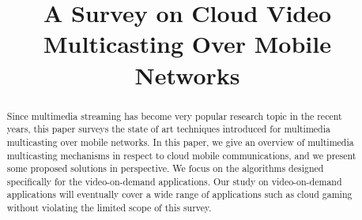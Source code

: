 \documentclass[conference]{IEEEtran}
\begin{document}
\title{A Survey on Cloud Video Multicasting Over Mobile Networks}


\author{

}



\maketitle
\begin{abstract}
Since multimedia streaming has become very popular research topic in the recent years, this paper surveys the state of art techniques introduced for multimedia multicasting over mobile networks. In this paper, we give an overview of multimedia multicasting mechanisms in respect to cloud mobile communications, and we present some proposed solutions in perspective. We focus on the algorithms designed specifically for the video-on-demand applications. Our study on video-on-demand applications will eventually cover a wide range of applications such as cloud gaming without violating the limited scope of this survey.
\end{abstract}
\IEEEpeerreviewmaketitle



\end{document}
